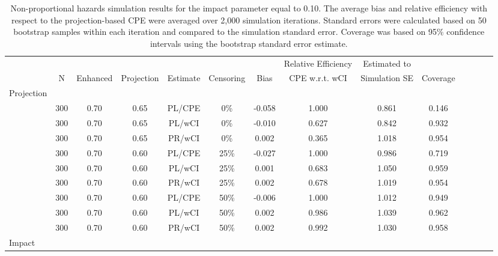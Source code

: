\documentclass[12pt]{article}
\begin{document}
 


\begin{table}[ht]
 \caption{Non-proportional hazards simulation results for the impact parameter equal to 0.10.
  The average bias and relative efficiency with respect to the projection-based CPE were averaged over 2,000 simulation iterations. Standard errors were calculated based on 50 bootstrap samples within each iteration and compared to the simulation standard error. Coverage was based on 95\% confidence intervals using the bootstrap standard error estimate.   }
\centering
\tiny
\begin{tabular}{lccccccccccccc} \label{NPHsimresultsDelta010}
\vspace{-0.25cm}
   &&&&&&  & Relative Efficiency   & Estimated to  &\\
& N & Enhanced &  Projection & Estimate & Censoring &Bias & CPE w.r.t. wCI & Simulation SE & Coverage \\
 \hline
 \hline
 Projection &&&&&&&&& \\
&  300 &0.70 & 0.65 & PL/CPE & 0\% &  -0.058 & 1.000 &0.861 & 0.146 \\ 
&300 &0.70 & 0.65 & PL/wCI &0\%  &-0.010 & 0.627 & 0.842 & 0.932 \\ 
&300 &0.70 & 0.65 & PR/wCI  &0\%  & 0.002 & 0.365 & 1.018 & 0.954 \\  
\hline
&300 &0.70 & 0.60 & PL/CPE  &25\% & -0.027 & 1.000 & 0.986 & 0.719 \\ 
&300 &0.70 & 0.60 & PL/wCI  &25\%  &  0.001 & 0.683 & 1.050 & 0.959 \\  
&300 &0.70 & 0.60 & PR/wCI &25\%  &   0.002 & 0.678 & 1.019 & 0.954 \\  
\hline
&300 &0.70 & 0.60 & PL/CPE  &50\%  &   -0.006 & 1.000 & 1.012 & 0.949 \\ 
&300 &0.70 & 0.60 & PL/wCI &50\%  & 0.002 & 0.986 & 1.039 & 0.962 \\
&300 &0.70 & 0.60 & PR/wCI &50\%  &   0.002 & 0.992 & 1.030 & 0.958 \\ 
  \hline
  \hline
  
  Impact &&&&&&&&& \\


\end{tabular}
\end{table}
\end{document}
